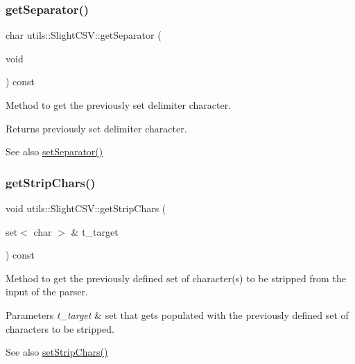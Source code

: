 \subsubsection{\texorpdfstring{get\+Separator()}{getSeparator()}}
{\footnotesize\ttfamily char utils\+::\+Slight\+C\+S\+V\+::get\+Separator (\begin{DoxyParamCaption}\item[{void}]{ }\end{DoxyParamCaption}) const}

Method to get the previously set delimiter character. \begin{DoxyReturn}{Returns}
previously set delimiter character. 
\end{DoxyReturn}
\begin{DoxySeeAlso}{See also}
\hyperlink{classutils_1_1SlightCSV_ab8cb026f9b404ef76e62eae60aecb999}{set\+Separator()} 
\end{DoxySeeAlso}
\mbox{\label{classutils_1_1SlightCSV_a13d435b5e07c827f6688efa9bf4673d4}} 
\subsubsection{\texorpdfstring{get\+Strip\+Chars()}{getStripChars()}}
{\footnotesize\ttfamily void utils\+::\+Slight\+C\+S\+V\+::get\+Strip\+Chars (\begin{DoxyParamCaption}\item[{set$<$ char $>$ \&}]{t\+\_\+target }\end{DoxyParamCaption}) const}

Method to get the previously defined set of character(s) to be stripped from the input of the parser. 
\begin{DoxyParams}{Parameters}
{\em t\+\_\+target} & set that gets populated with the previously defined set of characters to be stripped.\\
\hline
\end{DoxyParams}
\begin{DoxySeeAlso}{See also}
\hyperlink{classutils_1_1SlightCSV_a8a1d201855747b4c1207ecef5ac1e2b5}{set\+Strip\+Chars()} 
\end{DoxySeeAlso}
\mbox{\label{classutils_1_1SlightCSV_adea079ec76c9ee67d096f8fd39946380}} 
